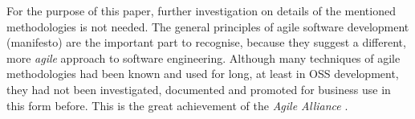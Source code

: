 For the purpose of this paper, further investigation on details of the
mentioned methodologies is not needed. The general principles of agile software
development (manifesto) are the important part to recognise, because they
suggest a different, more \emph{agile} approach to software engineering.
Although many techniques of agile methodologies had been known and used for
long, at least in OSS development, they had not been investigated, documented
and promoted for business use in this form before. This is the great
achievement of the \emph{Agile Alliance} \cite{agilealliance}.
